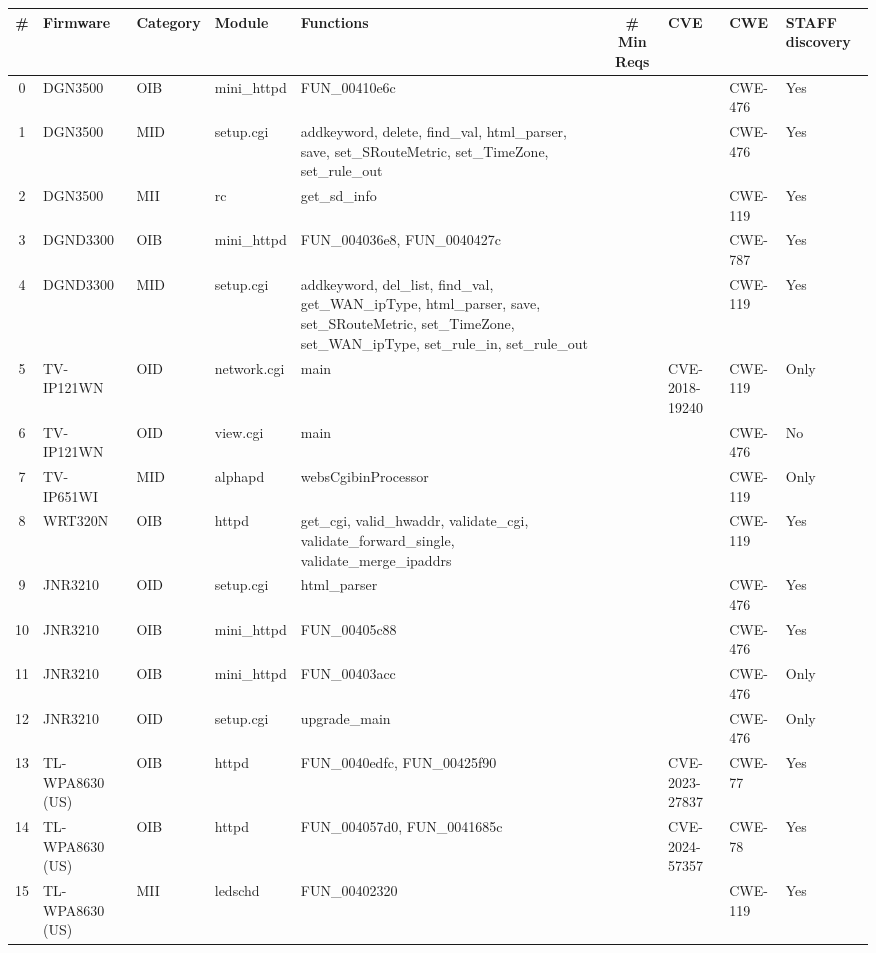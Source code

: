 \begin{table}[h]
\centering
\begin{tabular}{|c|l|l|l|l|c|l|l|l|}
\hline
{\sc \#} & {\sc Firmware} & {\sc Category} & {\sc Module} & {\sc Functions} & {\sc \# Min Reqs} & {\sc CVE} & {\sc CWE} & {\sc STAFF discovery} \\
\hline
0 & DGN3500 & OIB & mini\_httpd & FUN\_00410e6c &  &  & CWE-476 & Yes \\
\hline
1 & DGN3500 & MID & setup.cgi & addkeyword, delete, find\_val, html\_parser, save, set\_SRouteMetric, set\_TimeZone, set\_rule\_out &  &  & CWE-476 & Yes \\
\hline
2 & DGN3500 & MII & rc & get\_sd\_info &  &  & CWE-119 & Yes \\
\hline
3 & DGND3300 & OIB & mini\_httpd & FUN\_004036e8, FUN\_0040427c &  &  & CWE-787 & Yes \\
\hline
4 & DGND3300 & MID & setup.cgi & addkeyword, del\_list, find\_val, get\_WAN\_ipType, html\_parser, save, set\_SRouteMetric, set\_TimeZone, set\_WAN\_ipType, set\_rule\_in, set\_rule\_out &  &  & CWE-119 & Yes \\
\hline
5 & TV-IP121WN & OID & network.cgi & main &  & CVE-2018-19240 & CWE-119 & Only \\
\hline
6 & TV-IP121WN & OID & view.cgi & main &  &  & CWE-476 & No \\
\hline
7 & TV-IP651WI & MID & alphapd & websCgibinProcessor &  &  & CWE-119 & Only \\
\hline
8 & WRT320N & OIB & httpd & get\_cgi, valid\_hwaddr, validate\_cgi, validate\_forward\_single, validate\_merge\_ipaddrs &  &  & CWE-119 & Yes \\
\hline
9 & JNR3210 & OID & setup.cgi & html\_parser &  &  & CWE-476 & Yes \\
\hline
10 & JNR3210 & OIB & mini\_httpd & FUN\_00405c88 &  &  & CWE-476 & Yes \\
\hline
11 & JNR3210 & OIB & mini\_httpd & FUN\_00403acc &  &  & CWE-476 & Only \\
\hline
12 & JNR3210 & OID & setup.cgi & upgrade\_main &  &  & CWE-476 & Only \\
\hline
13 & TL-WPA8630 (US) & OIB & httpd & FUN\_0040edfc, FUN\_00425f90 &  & CVE-2023-27837 & CWE-77 & Yes \\
\hline
14 & TL-WPA8630 (US) & OIB & httpd & FUN\_004057d0, FUN\_0041685c &  & CVE-2024-57357 & CWE-78 & Yes \\
\hline
15 & TL-WPA8630 (US) & MII & ledschd & FUN\_00402320 &  &  & CWE-119 & Yes \\

\end{tabular}
\end{table}
